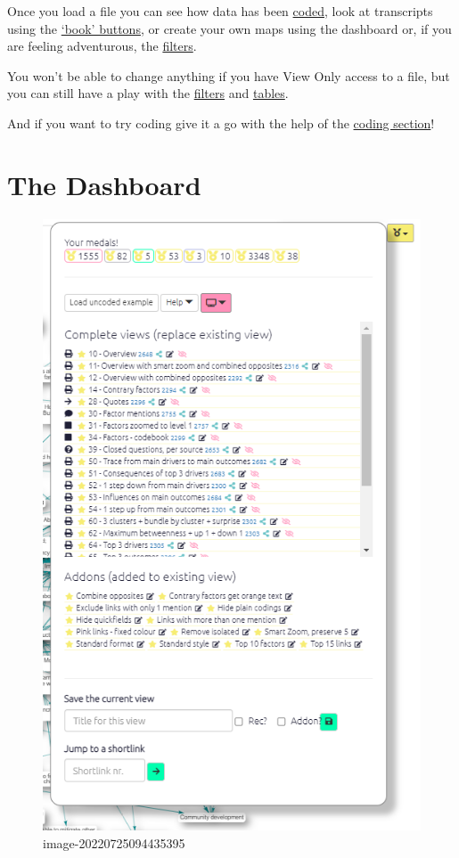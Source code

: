 \documentclass[
]{book}
\begin{document}
Once you load a file you can see how data has been \protect\hyperlink{xcoding-panel}{coded}, look at transcripts using the \protect\hyperlink{xstatement-nav}{`book' buttons}, or create your own maps using the dashboard or, if you are feeling adventurous, the \href{xintro-filters}{filters}.

You won't be able to change anything if you have View Only access to a file, but you can still have a play with the \protect\hyperlink{xintro-filters}{filters} and \href{x\#all-tables}{tables}.

And if you want to try coding give it a go with the help of the \protect\hyperlink{xcoding-panel}{coding section}!

\hypertarget{xdashboard}{%
\section{The Dashboard}\label{xdashboard}}

\begin{figure}
\centering
\includegraphics{_assets/image-20220725094435395.png}
\caption{image-20220725094435395}
\end{figure}
\end{document}

